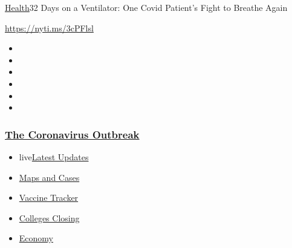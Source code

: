 \href{/section/health}{Health}\textbar{}32 Days on a Ventilator: One
Covid Patient's Fight to Breathe Again

\url{https://nyti.ms/3cPFlsl}

\begin{itemize}
\item
\item
\item
\item
\item
\item
\end{itemize}

\hypertarget{the-coronavirus-outbreak}{%
\subsubsection{\texorpdfstring{\href{https://www.nytimes3xbfgragh.onion/news-event/coronavirus?name=styln-coronavirus-national\&region=TOP_BANNER\&variant=undefined\&block=storyline_menu_recirc\&action=click\&pgtype=Article\&impression_id=49d02900-e3a1-11ea-96fb-13686c3e0279}{The
Coronavirus
Outbreak}}{The Coronavirus Outbreak}}\label{the-coronavirus-outbreak}}

\begin{itemize}
\tightlist
\item
  live\href{https://www.nytimes3xbfgragh.onion/2020/08/21/world/covid-19-coronavirus.html?name=styln-coronavirus-national\&region=TOP_BANNER\&variant=undefined\&block=storyline_menu_recirc\&action=click\&pgtype=Article\&impression_id=49d02901-e3a1-11ea-96fb-13686c3e0279}{Latest
  Updates}
\item
  \href{https://www.nytimes3xbfgragh.onion/interactive/2020/us/coronavirus-us-cases.html?name=styln-coronavirus-national\&region=TOP_BANNER\&variant=undefined\&block=storyline_menu_recirc\&action=click\&pgtype=Article\&impression_id=49d02902-e3a1-11ea-96fb-13686c3e0279}{Maps
  and Cases}
\item
  \href{https://www.nytimes3xbfgragh.onion/interactive/2020/science/coronavirus-vaccine-tracker.html?name=styln-coronavirus-national\&region=TOP_BANNER\&variant=undefined\&block=storyline_menu_recirc\&action=click\&pgtype=Article\&impression_id=49d02903-e3a1-11ea-96fb-13686c3e0279}{Vaccine
  Tracker}
\item
  \href{https://www.nytimes3xbfgragh.onion/2020/08/19/us/colleges-closing-covid.html?name=styln-coronavirus-national\&region=TOP_BANNER\&variant=undefined\&block=storyline_menu_recirc\&action=click\&pgtype=Article\&impression_id=49d02904-e3a1-11ea-96fb-13686c3e0279}{Colleges
  Closing}
\item
  \href{https://www.nytimes3xbfgragh.onion/live/2020/08/20/business/stock-market-today-coronavirus?name=styln-coronavirus-national\&region=TOP_BANNER\&variant=undefined\&block=storyline_menu_recirc\&action=click\&pgtype=Article\&impression_id=49d02905-e3a1-11ea-96fb-13686c3e0279}{Economy}
\end{itemize}

